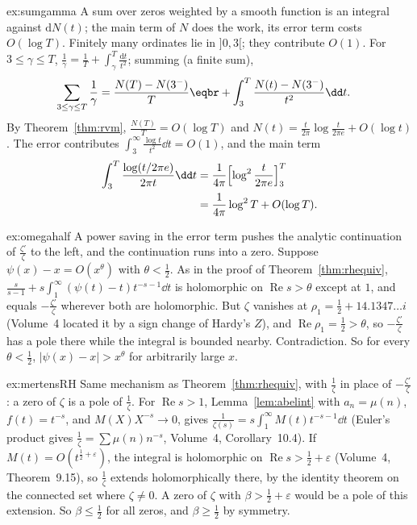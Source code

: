 \begin{solution}{ex:sumgamma}
\idea A sum over zeros weighted by a smooth function is an integral against $\mathrm dN(t)$; the main term of $N$ does the work, its error term costs $O(\log T)$.
\writeup Finitely many ordinates lie in $]0,3[$; they contribute $O(1)$. For $3\le\gamma\le T$, $\frac1\gamma=\frac1T+\int_\gamma^T\frac{\mathrm dt}{t^2}$; summing (a finite sum),
\[
\begin{aligned}\sum_{3\le\gamma\le T}\frac1\gamma&=\frac{N(T)-N(3^-)}T\eqbr+\int_3^T\frac{N(t)-N(3^-)}{t^2}\dd t.\end{aligned}
\]
By Theorem~\ref{thm:rvm}, $\frac{N(T)}T=O(\log T)$ and $N(t)=\frac t{2\pi}\log\frac t{2\pi e}+O(\log t)$. The error contributes $\int_3^\infty\frac{\log t}{t^2}\dd t=O(1)$, and the main term
\[
\begin{aligned}\int_3^T\frac{\log(t/2\pi e)}{2\pi t}\dd t&=\frac1{4\pi}\Bigl[\log^2\frac t{2\pi e}\Bigr]_3^T\\&=\frac1{4\pi}\log^2T+O(\log T).\end{aligned}
\]
\end{solution}

\begin{solution}{ex:omegahalf}
\idea A power saving in the error term pushes the analytic continuation of $\frac{\zeta'}\zeta$ to the left, and the continuation runs into a zero.
\writeup Suppose $\psi(x)-x=O(x^\theta)$ with $\theta<\frac12$. As in the proof of Theorem~\ref{thm:rhequiv}, $\frac s{s-1}+s\int_1^\infty(\psi(t)-t)t^{-s-1}\dd t$ is holomorphic on $\operatorname{Re}s>\theta$ except at $1$, and equals
$-\frac{\zeta'}\zeta$ wherever both are holomorphic. But $\zeta$ vanishes at $\rho_1=\frac12+14.1347\ldots i$ (Volume~4 located it by a sign change of Hardy's $Z$), and $\operatorname{Re}\rho_1=\frac12>\theta$, so
$-\frac{\zeta'}\zeta$ has a pole there while the integral is bounded nearby. Contradiction. So for every $\theta<\frac12$, $|\psi(x)-x|>x^\theta$ for arbitrarily large $x$.
\end{solution}

\begin{solution}{ex:mertensRH}
\idea Same mechanism as Theorem~\ref{thm:rhequiv}, with $\frac1\zeta$ in place of $-\frac{\zeta'}\zeta$: a zero of $\zeta$ is a pole of $\frac1\zeta$.
\writeup For $\operatorname{Re}s>1$, Lemma~\ref{lem:abelint} with $a_n=\mu(n)$, $f(t)=t^{-s}$, and $M(X)X^{-s}\to0$, gives $\frac1{\zeta(s)}=s\int_1^\infty M(t)t^{-s-1}\dd t$ (Euler's product gives $\frac1\zeta=\sum\mu(n)n^{-s}$,
Volume~4, Corollary~10.4). If $M(t)=O(t^{\frac12+\varepsilon})$, the integral is holomorphic on $\operatorname{Re}s>\frac12+\varepsilon$ (Volume~4, Theorem~9.15), so $\frac1\zeta$ extends holomorphically there, by the
identity theorem on the connected set where $\zeta\ne0$. A zero of $\zeta$ with $\beta>\frac12+\varepsilon$ would be a pole of this extension. So $\beta\le\frac12$ for all zeros, and $\beta\ge\frac12$ by symmetry.
\end{solution}

